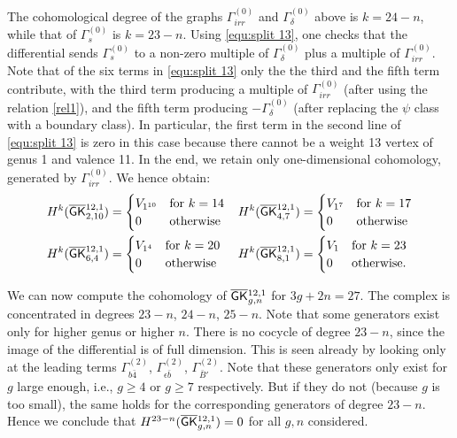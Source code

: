 The cohomological degree of the graphs $\Gamma^{(0)}_{irr}$ and $\Gamma^{(0)}_{\delta}$ above is $k=24-n$, while that of $\Gamma^{(0)}_{s}$ is $k=23-n$.
Using \eqref{equ:split 13},
one checks that the differential sends $\Gamma^{(0)}_{s}$ to a non-zero multiple of $\Gamma^{(0)}_{\delta}$ plus a multiple of $\Gamma^{(0)}_{irr}$. Note that of the six terms in \eqref{equ:split 13} only the the third and the fifth term contribute, with the third term producing a multiple of $\Gamma^{(0)}_{irr}$ (after using the relation \eqref{rel1}), and the fifth term producing $-\Gamma^{(0)}_{\delta}$ (after replacing the $\psi$ class with a boundary class). In particular, the first term in the second line of \eqref{equ:split 13} is zero in this case because there cannot be a weight 13 vertex of genus 1 and valence 11.
In the end, we retain only one-dimensional cohomology, generated by $\Gamma^{(0)}_{irr}$. We hence obtain:
\begin{align*}   H^k(\overline{\mathsf{GK}}{}^{12,1}_{2,10}) &=
    \begin{cases}
        V_{1^{10}} & \text{for $k=14$} \\
        0 & \text{otherwise}
    \end{cases}
&
H^k(\overline{\mathsf{GK}}{}^{12,1}_{4,7}) &=
    \begin{cases}
        V_{1^{7}} & \text{for $k=17$} \\
        0 & \text{otherwise}
    \end{cases}
\\
H^k(\overline{\mathsf{GK}}{}^{12,1}_{6,4}) &=
\begin{cases}
    V_{1^{4}} & \text{for $k=20$} \\
    0 & \text{otherwise}
\end{cases}     
&
H^k(\overline{\mathsf{GK}}{}^{12,1}_{8,1}) &=
\begin{cases}
    V_1 & \text{for $k=23$} \\
    0 & \text{otherwise.}
\end{cases}  
\end{align*}



We can now compute the cohomology of $\overline{\mathsf{GK}}{}^{12,1}_{g,n}$ for $3g+2n=27$. The complex is concentrated in degrees $23-n$, $24-n$, $25-n$. Note that some generators exist only for higher genus or higher $n$. There is no cocycle of degree $23-n$, since the image of the differential is of full dimension. This is seen already by looking only at the leading terms $\Gamma_{b\bar 4}^{(2)}$, $\Gamma_{\epsilon \bar b}^{(2)}$, $\Gamma_{\bar B'}^{(2)}$.
Note that these generators only exist for $g$ large enough, i.e., $g\geq 4$ or $g\geq 7$ respectively. But if they do not (because $g$ is too small), the same holds for the corresponding generators of degree $23-n$.
Hence we conclude that $H^{23-n}(\overline{\mathsf{GK}}{}^{12,1}_{g,n})=0$ for all $g,n$ considered.

